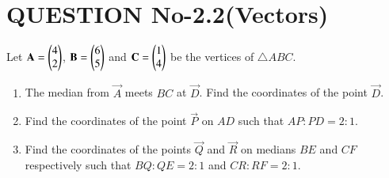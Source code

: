 \documentclass[journal,12pt,twocolumn]{IEEEtran}
\begin{document}
%
\section{QUESTION No-2.2(Vectors)}
\item Let $\mathbf{A} = \begin{pmatrix}4 \\ 2\end{pmatrix}$, $\mathbf{B}=\begin{pmatrix}6 \\ 5\end{pmatrix}$ and $\mathbf{C}=\begin{pmatrix}1 \\ 4\end{pmatrix}$ be the vertices of $\triangle ABC$.
\begin{enumerate}[label=\alph*.]
    \item The median from $\vec{A}$ meets $BC$ at $\vec{D}$. Find the coordinates of the point $\vec{D}$.
    \item Find the coordinates of the point $\vec{P}$ on $AD$
such that $AP : PD = 2 : 1$.
    \item Find the coordinates of the points $\vec{Q}$ and $\vec{R}$
on medians $BE$ and $CF$ respectively such that $BQ : QE = 2 : 1$ and $CR : RF = 2 : 1$.
\end{enumerate}
\end{document}
